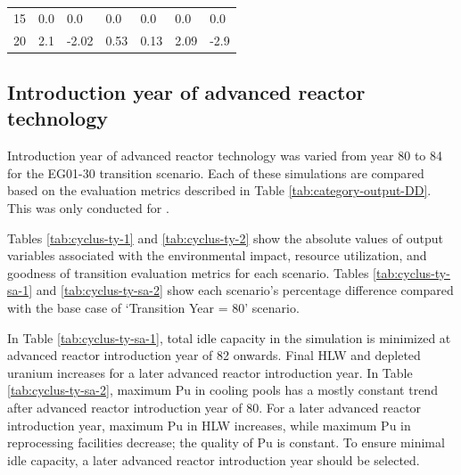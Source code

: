 \begin{table}[H]
\begin{tabularx}{\textwidth}{L|LLLLLL}
        15 & 0.0              & 0.0                            & 0.0           & 0.0                         & 0.0               & 0.0                             \\
        20 & 2.1              & -2.02                          & 0.53          & 0.13                        & 2.09              & -2.9                           \\ \hline
                           \end{tabularx}%
    
    \end{table}


\subsection{Introduction year of advanced reactor technology}
Introduction year of advanced reactor technology
was varied from year 80 to 84 for the 
EG01-30 transition scenario. 
Each of these simulations are compared based on the evaluation 
metrics described in Table \ref{tab:category-output-DD}.
This was only conducted for \Cyclus. 

Tables \ref{tab:cyclus-ty-1} and \ref{tab:cyclus-ty-2} show 
the absolute values of 
output variables associated with the environmental impact, 
resource utilization, and goodness of transition evaluation 
metrics for each scenario. 
Tables \ref{tab:cyclus-ty-sa-1} and \ref{tab:cyclus-ty-sa-2} 
show each scenario's percentage 
difference compared with the base case of `Transition Year = 80'
scenario. 

In Table \ref{tab:cyclus-ty-sa-1}, total idle capacity 
in the simulation is minimized at advanced reactor 
introduction year of 82 onwards. 
Final HLW and depleted uranium increases for a later 
advanced reactor introduction year.
In Table \ref{tab:cyclus-ty-sa-2}, maximum Pu in cooling 
pools has a mostly constant trend after advanced reactor 
introduction year of 80. 
For a later advanced reactor introduction year, 
maximum Pu in HLW increases, while maximum Pu in reprocessing facilities 
decrease; the quality of Pu is constant. 
To ensure minimal idle capacity, a later advanced reactor 
introduction year should be selected. 

